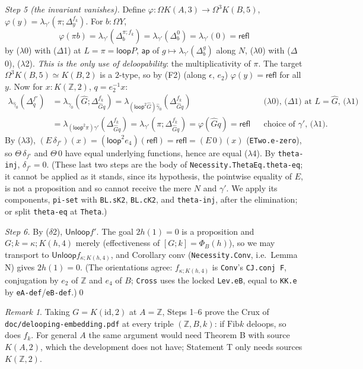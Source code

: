 \documentclass[11pt]{amsart}
\theoremstyle{definition}
\theoremstyle{remark}
\newtheorem{remark}[theorem]{Remark}
\newcommand{\Om}{\Omega}
\newcommand{\code}[1]{\texttt{#1}}
\newcommand{\refl}{\mathsf{refl}}
\newcommand{\ap}{\mathsf{ap}}
\newcommand{\Fib}{\mathrm{Fib}}
\newcommand{\Unloop}{\mathsf{Unloop}}
\newcommand{\lp}{\mathsf{loop}}
\newcommand{\Z}{\mathbb{Z}}
\newcommand{\cls}[1]{[#1]}
\begin{document}
\emph{Step 5 (the invariant vanishes).} Define
$\varphi:\Om K(A,3)\to\Om^3K(B,5)$, $\varphi(y)=\lambda_{\gamma'}(\pi;\Delta^{f_k}_y)$.
For $b:\Om Y$,
\[
\varphi(\pi b)=\lambda_{\gamma'}(\Delta^{\pi;f_k}_b)
  =\lambda_{\gamma'}(\Delta^{0}_b)=\lambda_{\gamma'}(0)=\refl
\]
by ($\lambda$0) with ($\Delta$1) at $L=\pi=\lp P$, $\ap$ of
$g\mapsto\lambda_{\gamma'}(\Delta^g_b)$ along $N$, ($\lambda$0) with ($\Delta$0),
($\lambda$2). \emph{This is the only use of
deloopability}: the multiplicativity of $\pi$. The target $\Om^3K(B,5)\simeq
K(B,2)$ is a $2$-type, so by (F2) (along $\epsilon$, $e_2$) $\varphi(y)=\refl$
for all $y$. Now for $x:K(\Z,2)$, $q=e_2^{-1}x$:
\begin{align*}
\lambda_{\hat\gamma_0}(\Delta^{f'}_q)
 &=\lambda_{\hat\gamma_0}(\hat G;\Delta^{f_k}_{\hat Gq})
  =\lambda_{(\lp^2\hat G)\hat\gamma_0}(\Delta^{f_k}_{\hat Gq})
  &&\text{($\lambda$0), ($\Delta$1) at $L=\hat G$, ($\lambda$1)}\\
 &=\lambda_{(\lp^2\pi)\gamma'}(\Delta^{f_k}_{\hat Gq})
  =\lambda_{\gamma'}(\pi;\Delta^{f_k}_{\hat Gq})=\varphi(\hat Gq)=\refl
  &&\text{choice of $\gamma'$, ($\lambda$1).}
\end{align*}
By ($\lambda$3), $(E\,\delta_{f'})(x)=(\lp^2e_4)(\refl)=\refl=(E\,0)(x)$
(\code{ETwo.e-zero}), so $\Theta\,\delta_{f'}$ and $\Theta\,0$ have equal
underlying functions, hence are equal ($\lambda$4). By \code{theta-inj},
$\delta_{f'}=0$. (These last two steps are the body of
\code{Necessity.ThetaEq.theta-eq}; it cannot be applied as it stands, since its
hypothesis, the pointwise equality of $E$, is not a proposition and so cannot
receive the mere $N$ and $\gamma'$. We apply its components, \code{pi-set} with
\code{BL.sK2}, \code{BL.cK2}, and \code{theta-inj}, after the elimination; or
split \code{theta-eq} at \code{Theta}.)

\emph{Step 6.} By ($\delta$2), $\Unloop f'$. The goal $2h(1)=0$ is a
proposition and $G;k=\kappa;K(h,4)$ merely (effectiveness of
$\cls{G;k}=\Phi_B(h)$), so we may transport to $\Unloop f_{\kappa;K(h,4)}$, and Corollary conv
(\code{Necessity.Conv}, i.e.\ Lemma N) gives $2h(1)=0$. (The orientations agree:
$f_{\kappa;K(h,4)}$ is \code{Conv}'s \code{CJ.conj F}, conjugation by $e_2$ of
$\Z$ and $e_4$ of $B$; \code{Cross} uses the locked \code{Lev.eB}, equal to
\code{KK.e} by \code{eA-def}/\code{eB-def}.)\qed

\begin{remark}
Taking $G=K(\mathrm{id},2)$ at $A=\Z$, Steps 1--6 prove the Crux of
\code{doc/delooping-embedding.pdf} at every triple $(\Z,B,k)$: if $\Fib k$
deloops, so does $f_k$. For general $A$ the same argument would need Theorem B
with source $K(A,2)$, which the development does not have; Statement T only
needs sources $K(\Z,2)$.
\end{remark}
\end{document}
